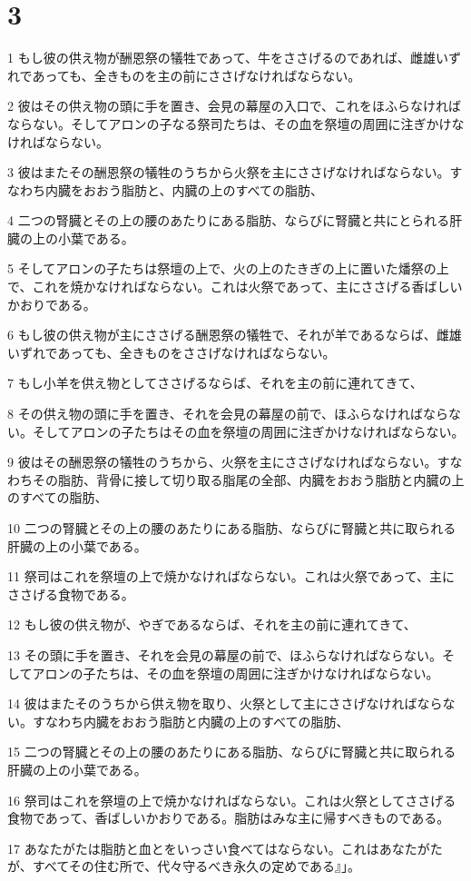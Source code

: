 \chapter{3}

\par 1 もし彼の供え物が酬恩祭の犠牲であって、牛をささげるのであれば、雌雄いずれであっても、全きものを主の前にささげなければならない。
\par 2 彼はその供え物の頭に手を置き、会見の幕屋の入口で、これをほふらなければならない。そしてアロンの子なる祭司たちは、その血を祭壇の周囲に注ぎかけなければならない。
\par 3 彼はまたその酬恩祭の犠牲のうちから火祭を主にささげなければならない。すなわち内臓をおおう脂肪と、内臓の上のすべての脂肪、
\par 4 二つの腎臓とその上の腰のあたりにある脂肪、ならびに腎臓と共にとられる肝臓の上の小葉である。
\par 5 そしてアロンの子たちは祭壇の上で、火の上のたきぎの上に置いた燔祭の上で、これを焼かなければならない。これは火祭であって、主にささげる香ばしいかおりである。
\par 6 もし彼の供え物が主にささげる酬恩祭の犠牲で、それが羊であるならば、雌雄いずれであっても、全きものをささげなければならない。
\par 7 もし小羊を供え物としてささげるならば、それを主の前に連れてきて、
\par 8 その供え物の頭に手を置き、それを会見の幕屋の前で、ほふらなければならない。そしてアロンの子たちはその血を祭壇の周囲に注ぎかけなければならない。
\par 9 彼はその酬恩祭の犠牲のうちから、火祭を主にささげなければならない。すなわちその脂肪、背骨に接して切り取る脂尾の全部、内臓をおおう脂肪と内臓の上のすべての脂肪、
\par 10 二つの腎臓とその上の腰のあたりにある脂肪、ならびに腎臓と共に取られる肝臓の上の小葉である。
\par 11 祭司はこれを祭壇の上で焼かなければならない。これは火祭であって、主にささげる食物である。
\par 12 もし彼の供え物が、やぎであるならば、それを主の前に連れてきて、
\par 13 その頭に手を置き、それを会見の幕屋の前で、ほふらなければならない。そしてアロンの子たちは、その血を祭壇の周囲に注ぎかけなければならない。
\par 14 彼はまたそのうちから供え物を取り、火祭として主にささげなければならない。すなわち内臓をおおう脂肪と内臓の上のすべての脂肪、
\par 15 二つの腎臓とその上の腰のあたりにある脂肪、ならびに腎臓と共に取られる肝臓の上の小葉である。
\par 16 祭司はこれを祭壇の上で焼かなければならない。これは火祭としてささげる食物であって、香ばしいかおりである。脂肪はみな主に帰すべきものである。
\par 17 あなたがたは脂肪と血とをいっさい食べてはならない。これはあなたがたが、すべてその住む所で、代々守るべき永久の定めである』」。


